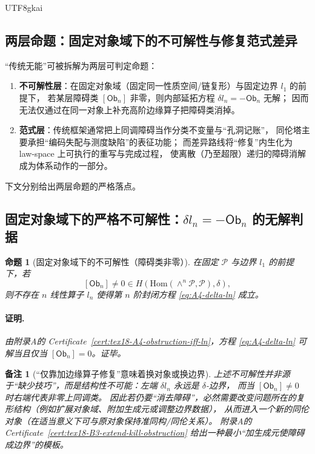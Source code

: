 \documentclass[12pt]{article}
\newtheorem{proposition}{命题}[section]
\newtheorem{remark}{备注}[section]
\newcommand{\Ob}{\ensuremath{\mathsf{Ob}}}
\begin{document}
\begin{CJK*}{UTF8}{gkai}
\subsection{两层命题：固定对象域下的不可解性与修复范式差异}
\label{subsec:tex18-two-layer-claims}

“传统无能”可被拆解为两层可判定命题：
\begin{enumerate}
  \item \textbf{不可解性层}：在固定对象域（固定同一性质空间/链复形）与固定边界 $l_1$ 的前提下，
        若某层障碍类 $[\Ob_n]$ 非零，则内部延拓方程 $\delta l_n=-\Ob_n$ 无解；
        因而无法仅通过在同一对象上补充高阶边缘算子把障碍类消掉。
  \item \textbf{范式层}：传统框架通常把上同调障碍当作分类不变量与“孔洞记账”，
        同伦塔主要承担“编码失配与测度缺陷”的表征功能；
        而差异路线将“修复”内生化为 law-space 上可执行的重写与完成过程，
        使离散（乃至超限）递归的障碍消解成为体系动作的一部分。
\end{enumerate}
下文分别给出两层命题的严格落点。

\subsection{固定对象域下的严格不可解性：$\delta l_n=-\Ob_n$ 的无解判据}
\label{subsec:tex18-fixed-domain-impossibility}

\begin{proposition}[固定对象域下的不可解性（障碍类非零）]
在固定 $\mathcal{P}$ 与边界 $l_1$ 的前提下，若
\[
  [\Ob_n]\neq 0\in H\!\left(\mathrm{Hom}(\wedge^n\mathcal{P},\mathcal{P}),\delta\right),
\]
则不存在 $n$ 线性算子 $l_n$ 使得第 $n$ 阶封闭方程 \eqref{eq:A4-delta-ln} 成立。
\paragraph{证明.}
由附录A的 Certificate~\ref{cert:tex18-A4-obstruction-iff-ln}，方程 \eqref{eq:A4-delta-ln} 可解当且仅当 $[\Ob_n]=0$。证毕。
\end{proposition}

\begin{remark}[“仅靠加边缘算子修复”意味着换对象或换边界]
上述不可解性并非源于“缺少技巧”，而是结构性不可能：左端 $\delta l_n$ 永远是 $\delta$-边界，
而当 $[\Ob_n]\neq 0$ 时右端代表非零上同调类。
因此若仍要“消去障碍”，必然需要改变问题所在的复形结构（例如扩展对象域、附加生成元或调整边界数据），
从而进入一个新的同伦对象（在适当意义下可与原对象保持准同构/同伦关系）。
附录A的 Certificate~\ref{cert:tex18-B3-extend-kill-obstruction} 给出一种最小“加生成元使障碍成边界”的模板。
\end{remark}


\end{CJK*}
\end{document}
